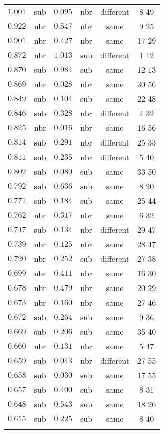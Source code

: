 \begin{table}[!htbp]
\begin{tabular}{@{\extracolsep{5pt}} cccccc}
$1.001$ & sub & $0.095$ & nbr & different & 8 49  \\ 
$0.922$ & nbr & $0.547$ & nbr & same & 9 25  \\ 
$0.901$ & nbr & $0.427$ & nbr & same & 17 29  \\ 
$0.872$ & nbr & $1.013$ & sub & different & 1 12  \\ 
$0.870$ & sub & $0.984$ & sub & same & 12 13  \\ 
$0.869$ & nbr & $0.028$ & nbr & same & 30 56  \\ 
$0.849$ & sub & $0.104$ & sub & same & 22 48  \\ 
$0.846$ & sub & $0.328$ & nbr & different & 4 32  \\ 
$0.825$ & nbr & $0.016$ & nbr & same & 16 56  \\ 
$0.814$ & sub & $0.291$ & nbr & different & 25 33  \\ 
$0.811$ & sub & $0.235$ & nbr & different & 5 40  \\ 
$0.802$ & sub & $0.080$ & sub & same & 33 50  \\ 
$0.792$ & sub & $0.636$ & sub & same & 8 20  \\ 
$0.771$ & sub & $0.184$ & sub & same & 25 44  \\ 
$0.762$ & nbr & $0.317$ & nbr & same & 6 32  \\ 
$0.747$ & sub & $0.134$ & nbr & different & 29 47  \\ 
$0.739$ & nbr & $0.125$ & nbr & same & 28 47  \\ 
$0.720$ & nbr & $0.252$ & sub & different & 27 38  \\ 
$0.699$ & nbr & $0.411$ & nbr & same & 16 30  \\ 
$0.678$ & nbr & $0.479$ & nbr & same & 20 29  \\ 
$0.673$ & nbr & $0.160$ & nbr & same & 27 46  \\ 
$0.672$ & sub & $0.264$ & sub & same & 9 36  \\ 
$0.669$ & sub & $0.206$ & sub & same & 35 40  \\ 
$0.660$ & nbr & $0.131$ & nbr & same & 5 47  \\ 
$0.659$ & sub & $0.043$ & nbr & different & 27 55  \\ 
$0.658$ & sub & $0.030$ & sub & same & 17 55  \\ 
$0.657$ & sub & $0.400$ & sub & same & 8 31  \\ 
$0.648$ & sub & $0.543$ & sub & same & 18 26  \\ 
$0.615$ & sub & $0.225$ & sub & same & 8 40  \\ 
\hline \\[-1.8ex] 
\end{tabular} 
\end{table} 
